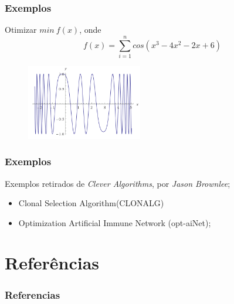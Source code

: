 \documentclass{beamer}
\begin{document}
\begin{frame}
    \frametitle{Exemplos}
    
    Otimizar $min \: f(x)$, onde
    \begin{equation}
        f(x) = \sum_{i=1}^n cos(x^3 - 4x^2 - 2x + 6)
    \end{equation}
    
    \begin{figure}[!ht]
        \centering
        \includegraphics[width=0.45\textwidth]{f1}
    \end{figure}
\end{frame}

\begin{frame}
    \frametitle{Exemplos}
    
    Exemplos retirados de \textit{Clever Algorithms}, por \textit{Jason Brownlee};
    
    \begin{itemize}
        \item  Clonal Selection Algorithm(CLONALG)
        \item Optimization Artificial Immune Network (opt-aiNet);
    \end{itemize}
    
\end{frame}



\section{Refer\^encias}

\begin{frame}[allowframebreaks]
        \frametitle{Referencias}
        
        
\end{frame}
\end{document}
